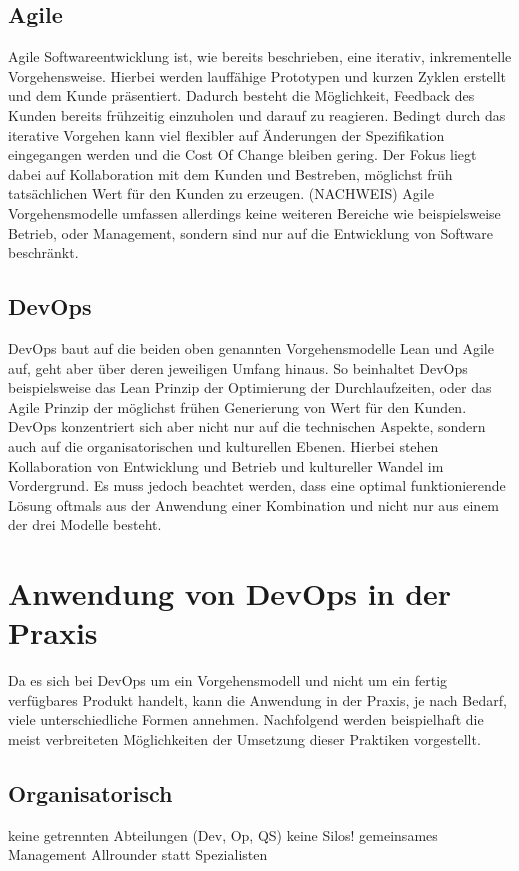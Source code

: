 \subsection{Agile}
Agile Softwareentwicklung ist, wie bereits beschrieben, eine iterativ, inkrementelle Vorgehensweise. Hierbei werden lauffähige Prototypen und kurzen Zyklen erstellt und dem Kunde präsentiert. Dadurch besteht die Möglichkeit, Feedback des Kunden bereits frühzeitig einzuholen und darauf zu reagieren. Bedingt durch das iterative Vorgehen kann viel flexibler auf Änderungen der Spezifikation eingegangen werden und die Cost Of Change bleiben gering. Der Fokus liegt dabei auf Kollaboration mit dem Kunden und Bestreben, möglichst früh tatsächlichen Wert für den Kunden zu erzeugen. (NACHWEIS) Agile Vorgehensmodelle umfassen allerdings keine weiteren Bereiche wie beispielsweise Betrieb, oder Management, sondern sind nur auf die Entwicklung von Software beschränkt.

\subsection{DevOps}
DevOps baut auf die beiden oben genannten Vorgehensmodelle Lean und Agile auf, geht aber über deren jeweiligen Umfang hinaus. So beinhaltet DevOps beispielsweise das Lean Prinzip der Optimierung der Durchlaufzeiten, oder das Agile Prinzip der möglichst frühen Generierung von Wert für den Kunden. DevOps konzentriert sich aber nicht nur auf die technischen Aspekte, sondern auch auf die organisatorischen und kulturellen Ebenen. Hierbei stehen Kollaboration von Entwicklung und Betrieb und kultureller Wandel im Vordergrund.
Es muss jedoch beachtet werden, dass eine optimal funktionierende Lösung oftmals aus der Anwendung einer Kombination und nicht nur aus einem der drei Modelle besteht.

\section{Anwendung von DevOps in der Praxis} %
Da es sich bei DevOps um ein Vorgehensmodell und nicht um ein fertig verfügbares Produkt handelt, kann die Anwendung in der Praxis, je nach Bedarf, viele unterschiedliche Formen annehmen. Nachfolgend werden beispielhaft die meist verbreiteten Möglichkeiten der Umsetzung dieser Praktiken vorgestellt.

\subsection{Organisatorisch}
keine getrennten Abteilungen (Dev, Op, QS)
keine Silos!
gemeinsames Management
Allrounder statt Spezialisten

